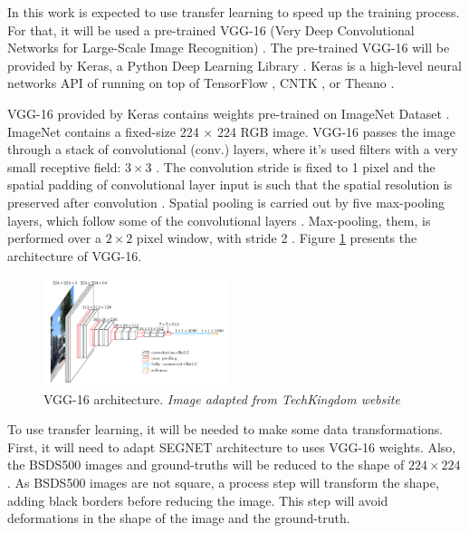 \documentclass[10pt,twocolumn,letterpaper]{article}
\begin{document}
In this work is expected to use transfer learning to speed up the training process. For that, it will be used a pre-trained VGG-16 (Very Deep Convolutional Networks for Large-Scale Image Recognition) \cite{VGGNET}. The pre-trained VGG-16 will be provided by Keras, a Python Deep Learning Library \cite{KERAS}. Keras is a high-level neural networks API of running on top of TensorFlow \cite{TENSORFLOW}, CNTK \cite{CNTK}, or Theano \cite{THEANO} \cite{KERAS}.

VGG-16 provided by Keras contains weights pre-trained on ImageNet Dataset \cite{IMAGENET}. ImageNet contains a fixed-size 224 × 224 RGB image. VGG-16 passes the image through a stack of convolutional (conv.) layers, where it's used filters with a very small receptive field: $3 \times 3$ \cite{VGGNET}. The convolution stride is fixed to 1 pixel and the spatial padding of convolutional layer input is such that the spatial resolution is preserved after convolution \cite{VGGNET}. Spatial pooling is carried out by five max-pooling layers, which follow some of the convolutional layers \cite{VGGNET}. Max-pooling, them, is performed over a $2 \times 2$ pixel window, with stride 2 \cite{VGGNET}. Figure \ref{fig:vgg16} presents the architecture of VGG-16.

\begin{figure}[ht]
  \centering
  \includegraphics[width=0.48\textwidth]{vgg16.png}
  \caption{VGG-16 architecture. \textit{Image adapted from TechKingdom website\cite{VGG16_IMG}}}
  \label{fig:vgg16}
\end{figure}

To use transfer learning, it will be needed to make some data transformations. First, it will need to adapt SEGNET architecture to uses VGG-16 weights. Also, the BSDS500 images and ground-truths will be reduced to the shape of $ 224 \times 224$. As BSDS500 images are not square, a process step will transform the shape, adding black borders before reducing the image. This step will avoid deformations in the shape of the image and the ground-truth.

\end{document}
